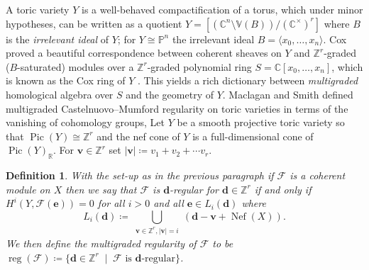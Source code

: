 \documentclass[11pt,reqno]{amsart}
\newtheorem{defn}[lemma]{Definition}
\theoremstyle{remark}
\newcommand{\reg}{\operatorname{reg}}
\newcommand{\Pic}{\operatorname{Pic}}
\newcommand{\Nef}{\operatorname{Nef}}
\newcommand{\dd}{\mathbf{d}}
\newcommand{\ee}{\mathbf{e}}
\newcommand{\vv}{\mathbf{v}}
\newcommand{\CC}{\mathbb{C}}
\newcommand{\PP}{\mathbb{P}}
\newcommand{\RR}{\mathbb{R}}
\newcommand{\VV}{\mathbb{V}}
\newcommand{\ZZ}{\mathbb{Z}}
\newcommand{\cF}{\mathcal{F}}
\begin{document}
A toric variety $Y$ is a well-behaved compactification of a torus, which under minor hypotheses, can be written as a quotient $Y=[(\CC^{n}\setminus \VV(B))/(\CC^{\times})^r]$ where $B$ is the \emph{irrelevant ideal} of $Y$; for $Y\cong \PP^n$ the irrelevant ideal $B=\langle x_0,\ldots,x_n\rangle$. Cox proved a beautiful correspondence between coherent sheaves on $Y$ and $\ZZ^r$-graded ($B$-saturated) modules over a $\ZZ^r$-graded polynomial ring $S=\CC[x_0,\ldots,x_n]$, which is known as the Cox ring of $Y$ \cite{cox95}. This yields a rich dictionary between \emph{multigraded} homological algebra over $S$ and the geometry of $Y$. Maclagan and Smith defined multigraded Castelnuovo--Mumford regularity on toric varieties in terms of the vanishing of cohomology groups,  Let $Y$ be a smooth projective toric variety so that $\Pic(Y)\cong \ZZ^r$ and the nef cone of $Y$  is a full-dimensional cone of $\Pic(Y)_{\RR}$. For $\vv \in \ZZ^r$ set $|\vv|\coloneqq v_1+v_2+\cdots v_r$. 

\begin{defn}\cite[Definition 6.1]{maclaganSmith04}\label{def:mg-reg}
With the set-up as in the previous paragraph if $\cF$ is a coherent module on $X$ then we say that $\cF$ is \emph{$\dd$-regular} for $\dd \in \ZZ^r$ if and only if $H^i(Y, \cF(\ee))=0$ for all $i>0$ and all $\ee \in L_{i}(\dd)$ where
\[
L_{i}(\dd) \coloneqq \bigcup_{\substack{\vv\in \ZZ^r, |\vv|=i}} \left(\dd-\vv + \Nef(X)\right).
\]
We then define the \emph{multigraded regularity} of $\cF$ to be $\reg(\cF)\coloneqq \{\dd\in \ZZ^r \;\; | \;\; \text{$\cF$ is $\dd$-regular}\}$. 
\end{defn}
\end{document}
